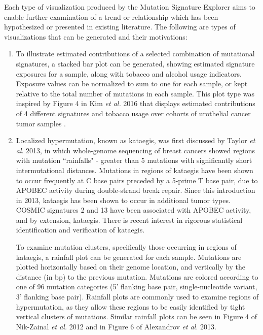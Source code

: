 \documentclass[12pt, letterpaper]{article}
\begin{document}
Each type of visualization produced by the Mutation Signature Explorer aims to enable further examination of a trend or relationship which has been hypothesized or presented in existing literature.
The following are types of visualizations that can be generated and their motivations:
\begin{enumerate}
\item To illustrate estimated contributions of a selected combination of mutational signatures, a stacked bar plot can be generated, showing estimated signature exposures for a sample, along with tobacco and alcohol usage indicators.
Exposure values can be normalized to sum to one for each sample, or kept relative to the total number of mutations in each sample.
This plot type was inspired by Figure 4 in Kim \textit{et al.} 2016 that displays estimated contributions of 4 different signatures and tobacco usage over cohorts of urothelial cancer tumor samples \cite{kim2016somatic}.
    
\item Localized hypermutation, known as kataegis, was first discussed by Taylor \textit{et al}. 2013\cite{taylor2013dna}, in which whole-genome sequencing of breast cancers showed regions with mutation ``rainfalls" - greater than 5 mutations with significantly short intermutational distances. Mutations in regions of kataegis have been shown to occur frequently at C base pairs preceded by a 5-prime T base pair, due to APOBEC activity during double-strand break repair\cite{taylor2013dna}. Since this introduction in 2013, kataegis has been shown to occur in additional tumor types\cite{alexandrov2013signatures}. COSMIC signatures 2 and 13 have been associated with APOBEC activity, and by extension, kataegis\cite{alexandrov2013signatures}. There is recent interest in rigorous statistical identification and verification of kataegis\cite{yousif2018origins}.

To examine mutation clusters, specifically those occurring in regions of kataegis, a rainfall plot can be generated for each sample.
Mutations are plotted horizontally based on their genome location, and vertically by the distance (in bp) to the previous mutation.
Mutations are colored according to one of 96 mutation categories (5' flanking base pair, single-nucleotide variant, 3' flanking base pair).
Rainfall plots are commonly used to examine regions of hypermutation, as they allow these regions to be easily identified by tight vertical clusters of mutations. 
Similar rainfall plots can be seen in Figure 4 of Nik-Zainal \textit{et al.} 2012\cite{nik2012mutational} and in Figure 6 of Alexandrov \textit{et al}. 2013\cite{alexandrov2013signatures}.


\end{enumerate}
\end{document}
